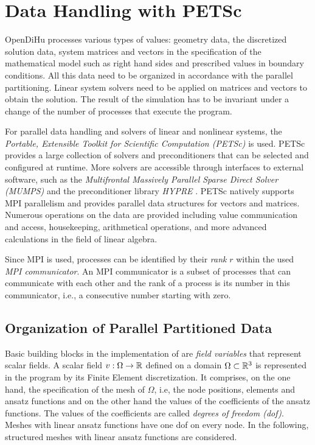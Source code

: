 

\section{Data Handling with PETSc}\label{sec:data_handling_with_petsc}

OpenDiHu processes various types of values: geometry data, the discretized solution data, system matrices and vectors in the specification of the mathematical model such as right hand sides and prescribed values in boundary conditions.
All this data need to be organized in accordance with the parallel partitioning. Linear system solvers need to be applied on matrices and vectors to obtain the solution.
The result of the simulation has to be invariant under a change of the number of processes that execute the program.

For parallel data handling and solvers of linear and nonlinear systems, the \emph{Portable, Extensible Toolkit for Scientific Computation (PETSc)} \cite{petsc-web-page,petsc-user-ref,petsc-efficient} is used. PETSc provides a large collection of solvers and preconditioners that can be selected and configured at runtime. More solvers are accessible through interfaces to external software, such as the \emph{Multifrontal Massively Parallel Sparse Direct Solver (MUMPS)} \cite{mumps2001,mumps2019} and the preconditioner library \emph{HYPRE} \cite{falgout2002hypre}. PETSc natively supports MPI parallelism and provides parallel data structures for vectors and matrices. Numerous operations on the data are provided including value communication and access, housekeeping, arithmetical operations, and more advanced calculations in the field of linear algebra.

Since MPI is used, processes can be identified by their \emph{rank} $r$ within the used \emph{MPI communicator}. An MPI communicator is a subset of processes that can communicate with each other and the rank of a process is its number in this communicator, i.e., a consecutive number starting with zero.

\subsection{Organization of Parallel Partitioned Data}\label{sec:oragnization_of_parallel_partitioned_data}

Basic building blocks in the implementation of \opendihu{} are \emph{field variables} that represent scalar fields.
A scalar field $v : \Omega \to \mathbb{R}$ defined on a domain $\Omega \subset \mathbb{R}^3$ is represented in the program by its Finite Element discretization. It comprises, on the one hand, the specification of the mesh of $\Omega$, i.e, the node positions, elements and ansatz functions and on the other hand the values of the coefficients of the ansatz functions. The values of the coefficients are called \emph{degrees of freedom (dof)}. Meshes with linear ansatz functions have one dof on every node. In the following, structured meshes with linear ansatz functions are considered.

